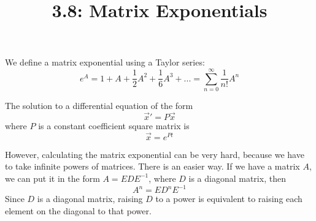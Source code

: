 \documentclass{article}
\title{3.8: Matrix Exponentials}
\begin{document}
\maketitle

\begin{definition}
We define a matrix exponential using a Taylor series: $$e^A = 1 + A + \frac{1}{2}A^2 + \frac{1}{6}A^3 + ... = \sum_{n=0}^{\infty} \frac{1}{n!}A^n$$
\end{definition}

\begin{proposition}
The solution to a differential equation of the form $$\vec{x}' = P\vec{x}$$where $P$ is a constant coefficient square matrix is $$\vec{x} = e^{Pt}$$
\end{proposition}

However, calculating the matrix exponential can be very hard, because we have to take infinite powers of matrices. There is an easier way. If we have a matrix $A$, we can put it in the form $A = EDE ^{-1}$, where $D$ is a diagonal matrix, then $$A^n = ED^nE ^{-1}$$Since $D$ is a diagonal matrix, raising $D$ to a power is equivalent to raising each element on the diagonal to that power. 
\end{document}

